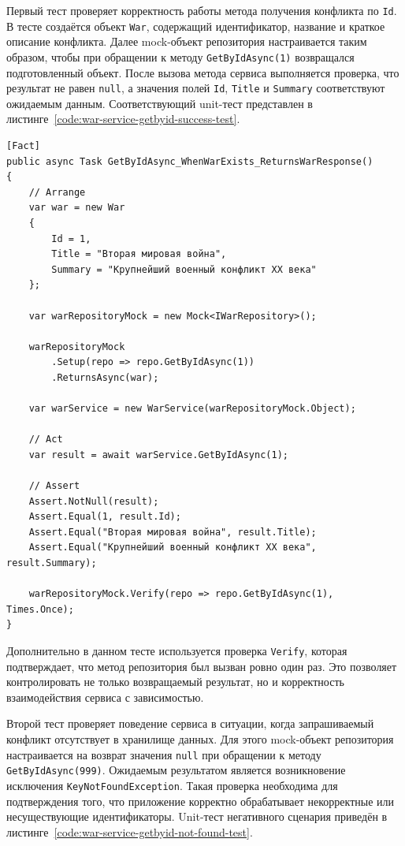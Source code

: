 Первый тест проверяет корректность работы метода получения конфликта по \texttt{Id}. В тесте создаётся объект \texttt{War}, содержащий идентификатор, название и краткое описание конфликта. Далее mock-объект репозитория настраивается таким образом, чтобы при обращении к методу \texttt{GetByIdAsync(1)} возвращался подготовленный объект. После вызова метода сервиса выполняется проверка, что результат не равен \texttt{null}, а значения полей \texttt{Id}, \texttt{Title} и \texttt{Summary} соответствуют ожидаемым данным. Соответствующий unit-тест представлен в листинге~\ref{code:war-service-getbyid-success-test}.

\begin{code}
\label{code:war-service-getbyid-success-test}
\vspace{-0.75cm}
\begin{verbatim}
[Fact]
public async Task GetByIdAsync_WhenWarExists_ReturnsWarResponse()
{
    // Arrange
    var war = new War
    {
        Id = 1,
        Title = "Вторая мировая война",
        Summary = "Крупнейший военный конфликт XX века"
    };

    var warRepositoryMock = new Mock<IWarRepository>();

    warRepositoryMock
        .Setup(repo => repo.GetByIdAsync(1))
        .ReturnsAsync(war);

    var warService = new WarService(warRepositoryMock.Object);

    // Act
    var result = await warService.GetByIdAsync(1);

    // Assert
    Assert.NotNull(result);
    Assert.Equal(1, result.Id);
    Assert.Equal("Вторая мировая война", result.Title);
    Assert.Equal("Крупнейший военный конфликт XX века", result.Summary);

    warRepositoryMock.Verify(repo => repo.GetByIdAsync(1), Times.Once);
}
\end{verbatim}
\end{code}

Дополнительно в данном тесте используется проверка \texttt{Verify}, которая подтверждает, что метод репозитория был вызван ровно один раз. Это позволяет контролировать не только возвращаемый результат, но и корректность взаимодействия сервиса с зависимостью.

Второй тест проверяет поведение сервиса в ситуации, когда запрашиваемый конфликт отсутствует в хранилище данных. Для этого mock-объект репозитория настраивается на возврат значения \texttt{null} при обращении к методу \texttt{GetByIdAsync(999)}. Ожидаемым результатом является возникновение исключения \texttt{KeyNotFoundException}. Такая проверка необходима для подтверждения того, что приложение корректно обрабатывает некорректные или несуществующие идентификаторы. Unit-тест негативного сценария приведён в листинге~\ref{code:war-service-getbyid-not-found-test}.

